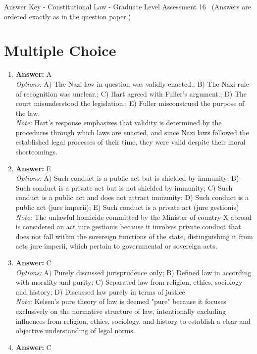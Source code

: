 \documentclass[12pt]{article}
\begin{document}
\begin{center}
Answer Key - Constitutional Law - Graduate Level Assessment 16 \
\small (Answers are ordered exactly as in the question paper.)
\end{center}

\section*{Multiple Choice}
\begin{enumerate}[label=\arabic*.]
\item \textbf{Answer:} A
\\ \textit{Options:} A) The Nazi law in question was validly enacted.; B) The Nazi rule of recognition was unclear.; C) Hart agreed with Fuller's argument.; D) The court misunderstood the legislation.; E) Fuller misconstrued the purpose of the law.
\\ \textit{Note:} Hart's response emphasizes that validity is determined by the procedures through which laws are enacted, and since Nazi laws followed the established legal processes of their time, they were valid despite their moral shortcomings.
\item \textbf{Answer:} E
\\ \textit{Options:} A) Such conduct is a public act but is shielded by immunity; B) Such conduct is a private act but is not shielded by immunity; C) Such conduct is a public act and does not attract immunity; D) Such conduct is a public act (jure imperii); E) Such conduct is a private act (jure gestionis)
\\ \textit{Note:} The unlawful homicide committed by the Minister of country X abroad is considered an act jure gestionis because it involves private conduct that does not fall within the sovereign functions of the state, distinguishing it from acts jure imperii, which pertain to governmental or sovereign acts.
\item \textbf{Answer:} C
\\ \textit{Options:} A) Purely discussed jurisprudence only; B) Defined law in according with morality and purity; C) Separated law from religion, ethics, sociology and history; D) Discussed law purely in terms of justice
\\ \textit{Note:} Kelsen's pure theory of law is deemed "pure" because it focuses exclusively on the normative structure of law, intentionally excluding influences from religion, ethics, sociology, and history to establish a clear and objective understanding of legal norms.
\item \textbf{Answer:} C

\end{enumerate}
\end{document}
